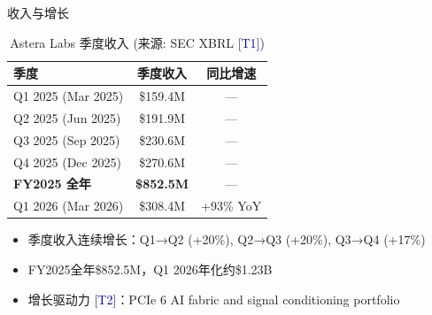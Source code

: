 \documentclass[UTF8,11pt,aspectratio=169]{beamer}
\newcommand{\sourceT}[1]{{\small\textcolor{darkblue}{[T#1]}}}
\begin{document}
\begin{frame}{收入与增长}
    \begin{table}
        \caption{Astera Labs 季度收入 (来源: SEC XBRL \sourceT{1})}
        \begin{tabular}{lcc}
            \toprule
            \textbf{季度} & \textbf{季度收入} & \textbf{同比增速} \\
            \midrule
            Q1 2025 (Mar 2025) & \$159.4M & — \\
            Q2 2025 (Jun 2025) & \$191.9M & — \\
            Q3 2025 (Sep 2025) & \$230.6M & — \\
            Q4 2025 (Dec 2025) & \$270.6M & — \\
            \rowcolor{blue!5}
            \textbf{FY2025 全年} & \textbf{\$852.5M} & — \\
            \midrule
            Q1 2026 (Mar 2026) & \$308.4M & +93\% YoY \\
            \bottomrule
        \end{tabular}
    \end{table}

    \begin{itemize}
        \item 季度收入连续增长：Q1→Q2 (+20\%), Q2→Q3 (+20\%), Q3→Q4 (+17\%)
        \item FY2025全年\$852.5M，Q1 2026年化约\$1.23B
        \item 增长驱动力 \sourceT{2}：PCIe 6 AI fabric and signal conditioning portfolio
    \end{itemize}
\end{frame}

\end{document}
